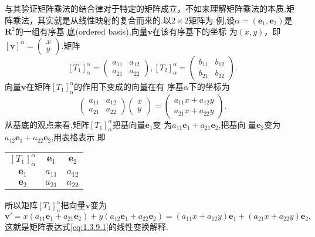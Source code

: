 ﻿\documentclass{book} \usepackage{exsheets} \usepackage{xeCJK}
\begin{document}
\begin{solution}
  与其验证矩阵乘法的结合律对于特定的矩阵成立，不如来理解矩阵乘法的本质.矩
  阵乘法，其实就是从线性映射的复合而来的.以$2\times 2$矩阵为
  例,设$\alpha=(\mathbf{e}_1,\mathbf{e}_2)$是$\mathbf{R}^2$的一组有序基
  底(ordered
  basis),向量$\mathbf{v}$在该有序基下的坐标
  为$(x,y)$，即$[\mathbf{v}]^{\alpha}=
  \begin{pmatrix}
    x\\
    y
  \end{pmatrix}
  $.矩阵
$$
[T_{1}]_{\alpha}^{\alpha}=
\begin{pmatrix}
  a_{11}&a_{12}\\
  a_{21}&a_{22}
\end{pmatrix},[T_{2}]_{\alpha}^{\alpha}=
\begin{pmatrix}
  b_{11}&b_{12}\\
  b_{21}&b_{22}
\end{pmatrix}.
$$
向量$\mathbf{v}$在矩阵$[T_{1}]_{\alpha}^{\alpha}$的作用下变成的向量在有
序基$\alpha$下的坐标为
\begin{equation}\label{eq:1.3.9.1}\tag{1}
  \begin{pmatrix}
    a_{11}&a_{12}\\
    a_{21}&a_{22}
  \end{pmatrix}
  \begin{pmatrix}
    x\\
    y
  \end{pmatrix}=
  \begin{pmatrix}
    a_{11}x+a_{12}y\\
    a_{21}x+a_{22}y
  \end{pmatrix}.
\end{equation}
从基底的观点来看,矩阵$[T_1]_{\alpha}^{\alpha}$把基向量$\mathbf{e}_1$变
为$a_{11}\mathbf{e}_1+a_{21}\mathbf{e}_2$,把基向
量$\mathbf{e}_2$变为$a_{12}\mathbf{e}_1+a_{22}\mathbf{e}_2$,用表格表示
即
\begin{center}
  \begin{tabular}{|c|c|c|}
    $[T_1]_{\alpha}^{\alpha}$ & $\mathbf{e}_1$& $\mathbf{e}_{2}$\\
    $\mathbf{e}_1$ & $a_{11}$ & $a_{12}$ \\
    $\mathbf{e}_2$ & $a_{21}$ & $a_{22}$ \\
  \end{tabular}
\end{center}
所以矩阵$[T_1]_{\alpha}^{\alpha}$把向量$\mathbf{v}$变为
$$
\mathbf{v}'=x(a_{11}\mathbf{e}_1+a_{21}\mathbf{e}_2)+y(a_{12}\mathbf{e}_1+a_{22}\mathbf{e}_2)=(a_{11}x+a_{12}y)\mathbf{e}_1+(a_{21}x+a_{22}y)\mathbf{e}_2,
$$
这就是矩阵表达式\eqref{eq:1.3.9.1}的线性变换解释.\\


\end{solution}
\end{document}
